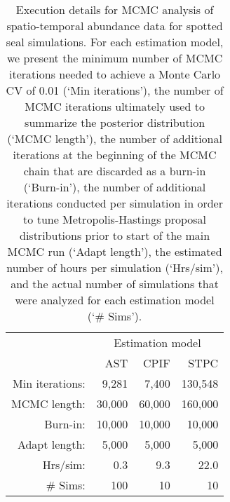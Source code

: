 \documentclass[12pt,fleqn]{article}
\begin{document}
\begin{flushleft}
\pagebreak

\begin{table}
\caption{Execution details for MCMC analysis of spatio-temporal abundance data for spotted seal simulations.  For each estimation model, we present the minimum number of MCMC iterations needed to achieve a Monte Carlo CV of 0.01 (`Min iterations'), the number of MCMC iterations ultimately used to summarize the posterior distribution (`MCMC length'), the number of additional iterations at the beginning of the MCMC chain that are discarded as a burn-in (`Burn-in'), the number of additional iterations conducted per simulation in order to tune Metropolis-Hastings proposal distributions prior to start of the main MCMC run (`Adapt length'), the estimated number of hours per simulation (`Hrs/sim'), and the actual number of simulations that were analyzed for each estimation model (`\# Sims'). }
\label{tab:run_times_Bering}
\begin{tabular}{rrrr}
\\
 & \multicolumn{3}{c}{Estimation model} \\
 & AST & CPIF & STPC \\
\hline \hline
Min iterations:  & 9,281 & 7,400 & 130,548 \\
MCMC length: & 30,000  & 60,000 & 160,000 \\
Burn-in: & 10,000 & 10,000 & 10,000 \\
Adapt length: & 5,000 & 5,000 & 5,000 \\
Hrs/sim:   & 0.3 & 9.3 & 22.0 \\
\# Sims:  & 100 & 10 & 10  \\
\hline
\end{tabular}
\end{table}

\pagebreak


\end{flushleft}
\end{document}
